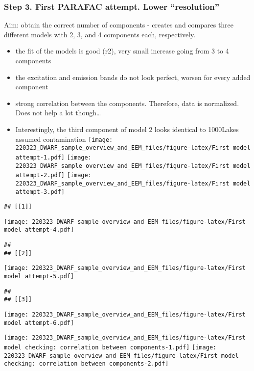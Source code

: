 \documentclass[
]{article}
\providecommand{\tightlist}{%
  \setlength{\itemsep}{0pt}\setlength{\parskip}{0pt}}
\begin{document}
\hypertarget{step-3.-first-parafac-attempt.-lower-resolution}{%
\subsubsection{Step 3. First PARAFAC attempt. Lower
``resolution''}\label{step-3.-first-parafac-attempt.-lower-resolution}}

Aim: obtain the correct number of components - creates and compares
three different models with 2, 3, and 4 components each, respectively.

\begin{itemize}
\tightlist
\item
  the fit of the models is good (r2), very small increase going from 3
  to 4 components
\item
  the excitation and emission bands do not look perfect, worsen for
  every added component
\item
  strong correlation between the components. Therefore, data is
  normalized. Does not help a lot though\ldots{}
\item
  Interestingly, the third component of model 2 looks identical to
  1000Lakes assumed contamination
  \texttt{[image: 220323\_DWARF\_sample\_overview\_and\_EEM\_files/figure-latex/First model attempt-1.pdf]}
  \texttt{[image: 220323\_DWARF\_sample\_overview\_and\_EEM\_files/figure-latex/First model attempt-2.pdf]}
  \texttt{[image: 220323\_DWARF\_sample\_overview\_and\_EEM\_files/figure-latex/First model attempt-3.pdf]}
\end{itemize}

\begin{verbatim}
## [[1]]
\end{verbatim}

\texttt{[image: 220323\_DWARF\_sample\_overview\_and\_EEM\_files/figure-latex/First model attempt-4.pdf]}

\begin{verbatim}
## 
## [[2]]
\end{verbatim}

\texttt{[image: 220323\_DWARF\_sample\_overview\_and\_EEM\_files/figure-latex/First model attempt-5.pdf]}

\begin{verbatim}
## 
## [[3]]
\end{verbatim}

\texttt{[image: 220323\_DWARF\_sample\_overview\_and\_EEM\_files/figure-latex/First model attempt-6.pdf]}

\texttt{[image: 220323\_DWARF\_sample\_overview\_and\_EEM\_files/figure-latex/First model checking: correlation between components-1.pdf]}
\texttt{[image: 220323\_DWARF\_sample\_overview\_and\_EEM\_files/figure-latex/First model checking: correlation between components-2.pdf]}
\end{document}
